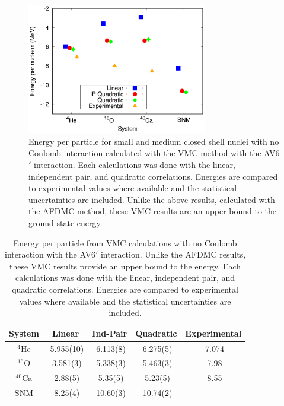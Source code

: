 \begin{figure}[h!]
   \centering
   \includegraphics[width=0.7\textwidth]{figures/energy_vmc.eps}
   \caption{Energy per particle for small and medium closed shell nuclei with no Coulomb interaction calculated with the VMC method with the AV6$'$ interaction. Each calculations was done with the linear, independent pair, and quadratic correlations. Energies are compared to experimental values where available and the statistical uncertainties are included. Unlike the above results, calculated with the AFDMC method, these VMC results are an upper bound to the ground state energy.}
   \label{fig:energies_vmc}
\end{figure}
\begin{table}[htb]
   \centering
   \begin{tabular}{ccccc}
      \hline\hline
      System & Linear & Ind-Pair & Quadratic & Experimental \\
      \hline
      $^4${He}    & -5.955(10)   & -6.113(8) & -6.275(5)    & -7.074 \\   
      $^{16}${O}  & -3.581(3)    & -5.338(3) & -5.463(3)    & -7.98  \\   
      $^{40}${Ca} & -2.88(5)     & -5.35(5)  & -5.23(5)     & -8.55  \\
      SNM         & -8.25(4)     & -10.60(3) & -10.74(2)    &        \\
      \hline\hline
   \end{tabular}
   \caption{Energy per particle from VMC calculations with no Coulomb interaction with the AV6$'$ interaction. Unlike the AFDMC results, these VMC results provide an upper bound to the energy. Each calculations was done with the linear, independent pair, and quadratic correlations. Energies are compared to experimental values where available and the statistical uncertainties are included.}
   \label{tab:energies_vmc}
\end{table}

